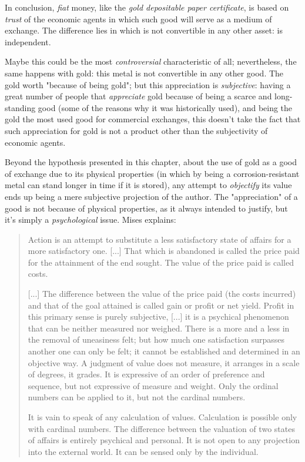 \documentclass[12pt,a4paper,twoside]{book}
\begin{document}
In conclusion, \textit{fiat} money, like the \textit{gold depositable paper certificate}, is based on \textit{trust} of the economic agents in which such good will serve as a medium of exchange. The difference lies in which is not convertible in any other asset: is independent.

Maybe this could be the most \textit{controversial} characteristic of all; nevertheless, the same happens with gold: this metal is not convertible in any other good. The gold worth "because of being gold"; but this appreciation is \textit{subjective}: having a great number of people that \textit{appreciate} gold because of being a scarce and long-standing good (some of the reasons why it was historically used), and being the gold the most used good for commercial exchanges, this doesn't take the fact that such appreciation for gold is not a product other than the subjectivity of economic agents.

Beyond the hypothesis presented in this chapter, about the use of gold as a good of exchange due to its physical properties (in which by being a corrosion-resistant metal  can stand longer in time if it is stored), any attempt to \textit{objectify} its value ends up being a mere subjective projection of the author. The "appreciation" of a good is not because of physical properties, as it always intended to justify, but it's simply a \textit{psychological} issue. Mises explains:

\begin{quotation}
Action is an attempt to substitute a less satisfactory state of affairs for a more satisfactory one. [...] That which is abandoned is called the price paid for the attainment of the end sought. The value of the price paid is called costs.

[...] The difference between the value of the price paid (the costs incurred) and that of the goal attained is called gain or profit or net yield. Profit in this primary sense is purely subjective, [...] it is a psychical phenomenon that can be neither measured nor weighed. There is a more and a less in the removal of uneasiness felt; but how much one satisfaction surpasses another one can only be felt; it cannot be established and determined in an objective way. A judgment of value does not measure, it arranges in a scale of degrees, it grades. It is expressive of an order of preference and sequence, but not expressive of measure and weight. Only the ordinal numbers can be applied to it, but not the cardinal numbers.

It is vain to speak of any calculation of values. Calculation is possible only with cardinal numbers. The difference between the valuation of two states of affairs is entirely psychical and personal. It is not open to any projection into the external world. It can be sensed only by the individual. \cite[pp. 97]{mises:ha}
\end{quotation}




\end{document}
